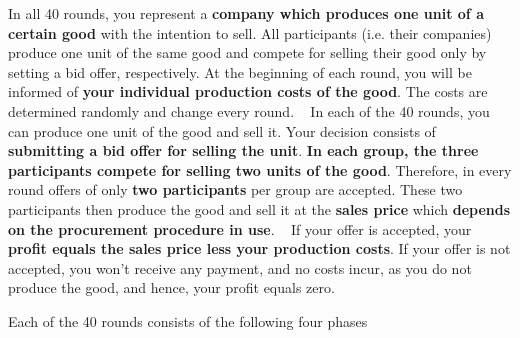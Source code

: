 \documentclass[11pt]{scrartcl}
\begin{document}

In all 40 rounds, you represent a \textbf{company which produces one unit of a certain good} with the intention to sell. All participants (i.e. their companies) produce one unit of the same good and compete for selling their good only by setting a bid offer, respectively. At the beginning of each round, you will be informed of \textbf{your individual production costs of the good}. The costs are determined randomly and change every round. ~\bigbreak
In each of the 40 rounds, you can produce one unit of the good and sell it. Your decision consists of \textbf{submitting a bid offer for selling the unit}. \textbf{In each group, the three participants compete for selling two units of the good}. Therefore, in every round offers of only \textbf{two participants} per group are accepted. These two participants then produce the good and sell it at the \textbf{sales price} which \textbf{depends on the procurement procedure in use}. ~\bigbreak
If your offer is accepted, your \textbf{profit equals the sales price less your production costs}. If your offer is not accepted, you won't receive any payment, and no costs incur, as you do not produce the good, and hence, your profit equals zero.



Each of the 40 rounds consists of the following four phases
\end{document}
